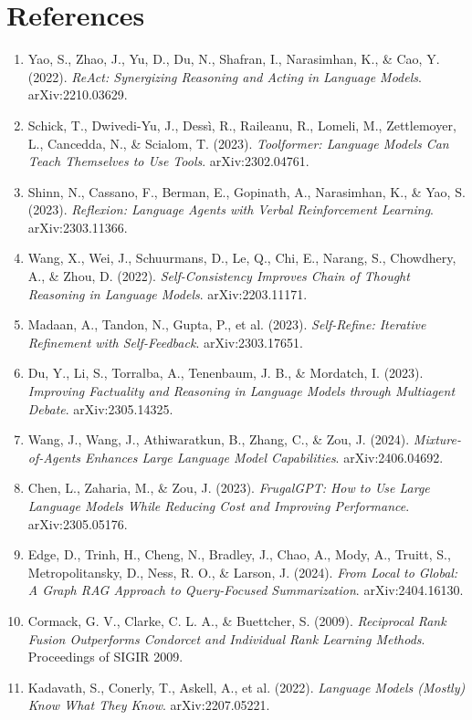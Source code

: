\documentclass[11pt]{article}
\begin{document}
\section*{References}

\begin{enumerate}[leftmargin=1.6cm]
\small
\item Yao, S., Zhao, J., Yu, D., Du, N., Shafran, I., Narasimhan, K., \& Cao, Y. (2022). \emph{ReAct: Synergizing Reasoning and Acting in Language Models}. arXiv:2210.03629.
\item Schick, T., Dwivedi-Yu, J., Dess\`i, R., Raileanu, R., Lomeli, M., Zettlemoyer, L., Cancedda, N., \& Scialom, T. (2023). \emph{Toolformer: Language Models Can Teach Themselves to Use Tools}. arXiv:2302.04761.
\item Shinn, N., Cassano, F., Berman, E., Gopinath, A., Narasimhan, K., \& Yao, S. (2023). \emph{Reflexion: Language Agents with Verbal Reinforcement Learning}. arXiv:2303.11366.
\item Wang, X., Wei, J., Schuurmans, D., Le, Q., Chi, E., Narang, S., Chowdhery, A., \& Zhou, D. (2022). \emph{Self-Consistency Improves Chain of Thought Reasoning in Language Models}. arXiv:2203.11171.
\item Madaan, A., Tandon, N., Gupta, P., et al. (2023). \emph{Self-Refine: Iterative Refinement with Self-Feedback}. arXiv:2303.17651.
\item Du, Y., Li, S., Torralba, A., Tenenbaum, J. B., \& Mordatch, I. (2023). \emph{Improving Factuality and Reasoning in Language Models through Multiagent Debate}. arXiv:2305.14325.
\item Wang, J., Wang, J., Athiwaratkun, B., Zhang, C., \& Zou, J. (2024). \emph{Mixture-of-Agents Enhances Large Language Model Capabilities}. arXiv:2406.04692.
\item Chen, L., Zaharia, M., \& Zou, J. (2023). \emph{FrugalGPT: How to Use Large Language Models While Reducing Cost and Improving Performance}. arXiv:2305.05176.
\item Edge, D., Trinh, H., Cheng, N., Bradley, J., Chao, A., Mody, A., Truitt, S., Metropolitansky, D., Ness, R. O., \& Larson, J. (2024). \emph{From Local to Global: A Graph RAG Approach to Query-Focused Summarization}. arXiv:2404.16130.
\item Cormack, G. V., Clarke, C. L. A., \& Buettcher, S. (2009). \emph{Reciprocal Rank Fusion Outperforms Condorcet and Individual Rank Learning Methods}. Proceedings of SIGIR 2009.
\item Kadavath, S., Conerly, T., Askell, A., et al. (2022). \emph{Language Models (Mostly) Know What They Know}. arXiv:2207.05221.

\end{enumerate}
\end{document}
